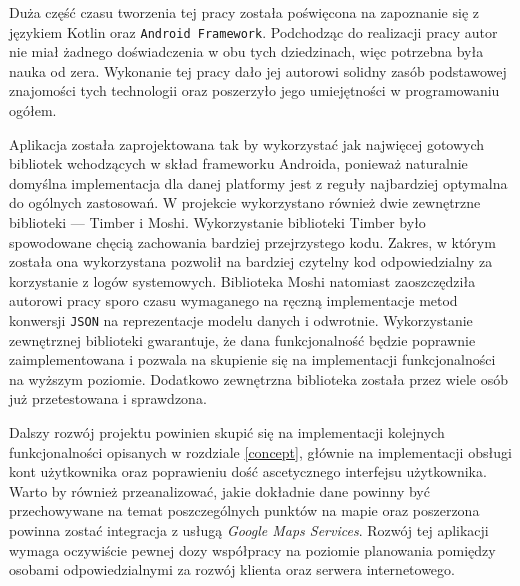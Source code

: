 \documentclass[polish,polish,a4paper,12pt]{article}
\let\sectioncmd\section
\renewcommand{\section}{\clearpage\sectioncmd}
\begin{document}
Duża część czasu tworzenia tej pracy została poświęcona na zapoznanie się z językiem Kotlin oraz \texttt{Android Framework}. Podchodząc do realizacji pracy autor nie miał żadnego doświadczenia w obu tych dziedzinach, więc potrzebna była nauka od zera. Wykonanie tej pracy dało jej autorowi solidny zasób podstawowej znajomości tych technologii oraz poszerzyło jego umiejętności w programowaniu ogółem.

Aplikacja została zaprojektowana tak by wykorzystać jak najwięcej gotowych bibliotek wchodzących w skład frameworku Androida, ponieważ naturalnie domyślna implementacja dla danej platformy jest z reguły najbardziej optymalna do ogólnych zastosowań. W projekcie wykorzystano również dwie zewnętrzne biblioteki — Timber i Moshi. Wykorzystanie biblioteki Timber było spowodowane chęcią zachowania bardziej przejrzystego kodu. Zakres, w którym została ona wykorzystana pozwolił na bardziej czytelny kod odpowiedzialny za korzystanie z logów systemowych. Biblioteka Moshi natomiast zaoszczędziła autorowi pracy sporo czasu wymaganego na ręczną implementacje metod konwersji \texttt{JSON} na reprezentacje modelu danych i odwrotnie. Wykorzystanie zewnętrznej biblioteki gwarantuje, że dana funkcjonalność będzie poprawnie zaimplementowana i pozwala na skupienie się na implementacji funkcjonalności na wyższym poziomie. Dodatkowo zewnętrzna biblioteka została przez wiele osób już przetestowana i sprawdzona.

Dalszy rozwój projektu powinien skupić się na implementacji kolejnych funkcjonalności opisanych w rozdziale \ref{concept}, głównie na implementacji obsługi kont użytkownika oraz poprawieniu dość ascetycznego interfejsu użytkownika. Warto by również przeanalizować, jakie dokładnie dane powinny być przechowywane na temat poszczególnych punktów na mapie oraz poszerzona powinna zostać integracja z usługą \textit{Google Maps Services}. Rozwój tej aplikacji wymaga oczywiście pewnej dozy współpracy na poziomie planowania pomiędzy osobami odpowiedzialnymi za rozwój klienta oraz serwera internetowego.

\printbibliography[heading=bibintoc,title={Literatura}]

\renewcommand{\section}{\sectioncmd}
\clearpage

\listoffigures
{}

\listoflistings
{}
\end{document}
